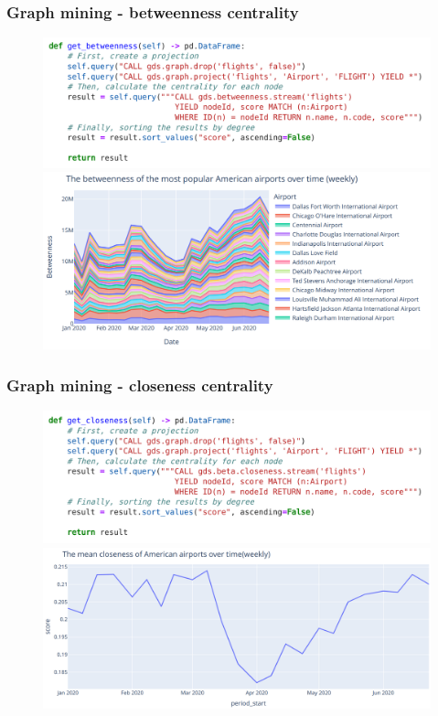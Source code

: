 \documentclass{beamer}
\begin{document}
\begin{frame}
\frametitle{Graph mining - betweenness centrality}

\begin{figure}
\centering
\includegraphics[width=0.6\linewidth]{../visualizations/get_betweenness_code.png}
\vfill
\includegraphics[width=0.6\linewidth]{../visualizations/betweenness_screenshot.png}
\end{figure}

\end{frame}


\begin{frame}
\frametitle{Graph mining - closeness centrality}

\begin{figure}
\centering
\includegraphics[width=0.6\linewidth]{../visualizations/get_closeness_code.png}
\vfill
\includegraphics[width=0.6\linewidth]{../visualizations/closeness_screenshot.png}
\end{figure}

\end{frame}

\end{document}
